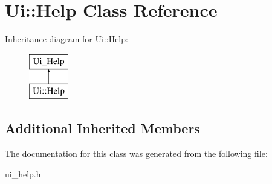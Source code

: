 \hypertarget{class_ui_1_1_help}{}\section{Ui\+:\+:Help Class Reference}
\label{class_ui_1_1_help}
Inheritance diagram for Ui\+:\+:Help\+:\begin{figure}[H]
\begin{center}
\leavevmode
\includegraphics[height=2.000000cm]{class_ui_1_1_help}
\end{center}
\end{figure}
\subsection*{Additional Inherited Members}


The documentation for this class was generated from the following file\+:\begin{DoxyCompactItemize}
\item 
ui\+\_\+help.\+h\end{DoxyCompactItemize}
